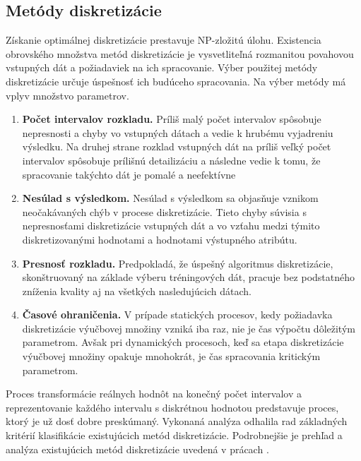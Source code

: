 \subsection{Metódy diskretizácie}
Získanie optimálnej diskretizácie prestavuje NP-zložitú úlohu. \cite{levashenkoProj, Chelbus1998} Existencia obrovského množstva metód diskretizácie je vysvetliteľná rozmanitou povahovou vstupných dát a požiadaviek na ich spracovanie. Výber použitej metódy diskretizácie určuje úspešnosť ich budúceho spracovania. Na výber metódy má vplyv množstvo parametrov.  \cite{levashenkoProj}
\begin{enumerate}
	\item \textbf{Počet intervalov rozkladu.}  Príliš malý počet intervalov spôsobuje nepresnosti a chyby vo vstupných dátach a vedie k hrubému vyjadreniu výsledku. Na druhej strane rozklad vstupných dát na príliš veľký počet intervalov spôsobuje prílišnú detailizáciu a následne vedie k tomu, že spracovanie takýchto dát je pomalé a neefektívne  \cite{levashenkoProj, Catlett1991}%
	\item \textbf{Nesúlad s výsledkom. }  Nesúlad s výsledkom sa objasňuje vznikom neočakávaných chýb v procese diskretizácie. Tieto chyby súvisia s nepresnosťami diskretizácie vstupných dát a vo vzťahu medzi týmito diskretizovanými hodnotami a hodnotami výstupného atribútu.  \cite{levashenkoProj}
	\item \textbf{Presnosť rozkladu.}  Predpokladá, že úspešný algoritmus diskretizácie, skonštruovaný na základe výberu tréningových dát, pracuje bez podstatného zníženia kvality aj na všetkých nasledujúcich dátach.  \cite{levashenkoProj}
	\item \textbf{Časové ohraničenia.}  V prípade statických procesov, kedy požiadavka diskretizácie výučbovej množiny vzniká iba raz, nie je čas výpočtu dôležitým parametrom. Avšak pri dynamických procesoch, keď sa etapa diskretizácie výučbovej množiny opakuje mnohokrát, je čas spracovania kritickým parametrom.  \cite{levashenkoProj}
\end{enumerate}

Proces transformácie reálnych hodnôt na konečný počet intervalov a reprezentovanie každého intervalu s diskrétnou hodnotou predstavuje proces, ktorý je už dosť dobre preskúmaný. Vykonaná analýza odhalila rad základných kritérií klasifikácie existujúcich metód diskretizácie. Podrobnejšie je prehľad a analýza existujúcich metód diskretizácie uvedená v prácach \cite{Lui2002, Liu2004, Singh2007, Bakar2009, Yang2010, Garcia2010, Garcia2013} . 

